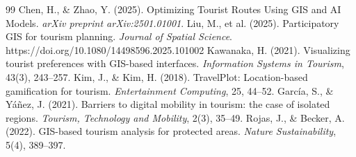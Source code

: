 \documentclass[12pt]{article}
\begin{document}
\begin{thebibliography}{99}
 Chen, H., \& Zhao, Y. (2025). Optimizing Tourist Routes Using GIS and AI Models. \textit{arXiv preprint arXiv:2501.01001}.
 Liu, M., et al. (2025). Participatory GIS for tourism planning. \textit{Journal of Spatial Science}. https://doi.org/10.1080/14498596.2025.101002
 Kawanaka, H. (2021). Visualizing tourist preferences with GIS-based interfaces. \textit{Information Systems in Tourism}, 43(3), 243–257.
 Kim, J., \& Kim, H. (2018). TravelPlot: Location-based gamification for tourism. \textit{Entertainment Computing}, 25, 44–52.
 García, S., \& Yáñez, J. (2021). Barriers to digital mobility in tourism: the case of isolated regions. \textit{Tourism, Technology and Mobility}, 2(3), 35–49.
 Rojas, J., \& Becker, A. (2022). GIS-based tourism analysis for protected areas. \textit{Nature Sustainability}, 5(4), 389–397.
\end{thebibliography}
\end{document}

